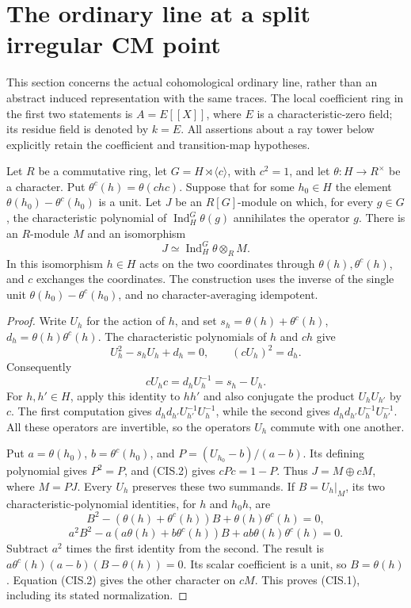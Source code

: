 \section{The ordinary line at a split irregular CM point}
\label{sec:cubic-irregular-saturation}

This section concerns the actual cohomological ordinary line, rather than
an abstract induced representation with the same traces.  The local
coefficient ring in the first two statements is
\(A=E[[X]]\), where \(E\) is a characteristic-zero field; its residue
field is denoted by \(k=E\).  All assertions about a ray tower below
explicitly retain the coefficient and transition-map hypotheses.

\begin{lemma}
\label{AC-K29-irregular-separation}
Let \(R\) be a commutative ring, let
\(G=H\rtimes\langle c\rangle\), with \(c^2=1\), and let
\(\theta:H\to R^\times\) be a character.  Put
\(\theta^c(h)=\theta(chc)\).  Suppose that for some \(h_0\in H\)
the element \(\theta(h_0)-\theta^c(h_0)\) is a unit.  Let \(J\) be
an \(R[G]\)-module on which, for every \(g\in G\), the characteristic
polynomial of \(\operatorname{Ind}_H^G\theta(g)\) annihilates the
operator \(g\).  There is an \(R\)-module \(M\) and an isomorphism
\[
 J\simeq \operatorname{Ind}_H^G\theta\otimes_R M.       \tag{CIS.1}
\]
In this isomorphism \(h\in H\) acts on the two coordinates through
\(\theta(h),\theta^c(h)\), and \(c\) exchanges the coordinates.
The construction uses the inverse of the single unit
\(\theta(h_0)-\theta^c(h_0)\), and no character-averaging idempotent.
\end{lemma}

\begin{proof}
Write \(U_h\) for the action of \(h\), and set
\(s_h=\theta(h)+\theta^c(h)\),
\(d_h=\theta(h)\theta^c(h)\).  The characteristic polynomials of
\(h\) and \(ch\) give
\[
 U_h^2-s_hU_h+d_h=0,\qquad (cU_h)^2=d_h.
\]
Consequently
\[
 cU_hc=d_hU_h^{-1}=s_h-U_h.                            \tag{CIS.2}
\]
For \(h,h'\in H\), apply this identity to \(hh'\) and also conjugate
the product \(U_hU_{h'}\) by \(c\).  The first computation gives
\(d_hd_{h'}U_{h'}^{-1}U_h^{-1}\), while the second gives
\(d_hd_{h'}U_h^{-1}U_{h'}^{-1}\).  All these operators are invertible,
so the operators \(U_h\) commute with one another.

Put \(a=\theta(h_0)\), \(b=\theta^c(h_0)\), and
\(P=(U_{h_0}-b)/(a-b)\).  Its defining polynomial gives
\(P^2=P\), and (CIS.2) gives \(cPc=1-P\).  Thus
\(J=M\oplus cM\), where \(M=PJ\).  Every \(U_h\) preserves these
two summands.  If \(B=U_h|_M\), its two characteristic-polynomial
identities, for \(h\) and \(h_0h\), are
\[
 B^2-(\theta(h)+\theta^c(h))B+\theta(h)\theta^c(h)=0,
\]
\[
 a^2B^2-a(a\theta(h)+b\theta^c(h))B
       +ab\theta(h)\theta^c(h)=0.
\]
Subtract \(a^2\) times the first identity from the second.  The result is
\(a\theta^c(h)(a-b)(B-\theta(h))=0\).  Its scalar coefficient is a
unit, so \(B=\theta(h)\).  Equation (CIS.2) gives the other character
on \(cM\).  This proves (CIS.1), including its stated normalization.
\end{proof}

